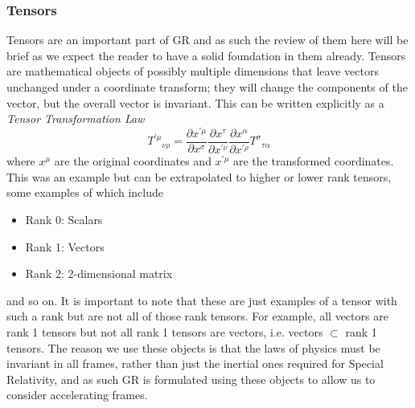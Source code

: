 \documentclass[12pt]{article}
\numberwithin{equation}{section}
\numberwithin{figure}{section}
\begin{document}
\subsubsection{Tensors} %
Tensors are an important part of GR and as such the review of them here will be brief as we expect the reader to have a solid foundation in them already. Tensors are mathematical objects of possibly multiple dimensions that leave vectors unchanged under a coordinate transform; they will change the components of the vector, but the overall vector is invariant. This can be written explicitly as a \emph{Tensor Transformation Law}
\begin{equation}
	{T^{\prime\mu}}_{\nu\rho} = \frac{\partial x^{\prime\mu}}{\partial x^\sigma}\frac{\partial x^\tau}{\partial x^{\prime\nu}}\frac{\partial x^\alpha}{\partial x^{\prime\rho}}{T^\sigma}_{\tau\alpha}
\end{equation}
where $x^\mu$ are the original coordinates and $x^{\prime\mu}$ are the transformed coordinates. This was an example but can be extrapolated to higher or lower rank tensors, some examples of which include
\begin{itemize}
	\item Rank 0: Scalars
	\item Rank 1: Vectors 
	\item Rank 2: 2-dimensional matrix
\end{itemize}
and so on. It is important to note that these are just examples of a tensor with such a rank but are not all of those rank tensors. For example, all vectors are rank 1 tensors but not all rank 1 tensors are vectors, i.e. vectors $\subset$ rank 1 tensors. The reason we use these objects is that the laws of physics must be invariant in all frames, rather than just the inertial ones required for Special Relativity, and as such GR is formulated using these objects to allow us to consider accelerating frames.
%
%
\end{document}
